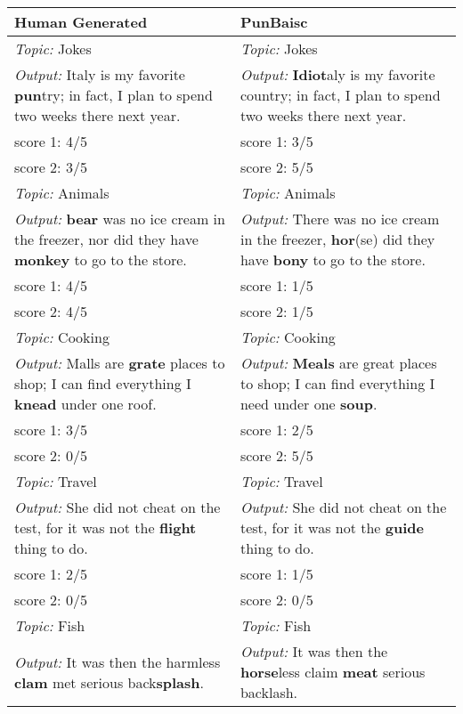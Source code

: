 \documentclass[11pt,letterpaper]{article}
\begin{document}
\begin{table}
  \centering
  \begin{tabular}{|P{7cm}|P{7cm}|}
    \hline
    Human Generated         & PunBaisc              \\ \hline
    \textit{Topic:} Jokes   & \textit{Topic:} Jokes \\
    \textit{Output:} Italy is my favorite \textbf{pun}try; in fact, I plan to spend two weeks there next year. & \textit{Output:} \textbf{Idiot}aly is my favorite country; in fact, I plan to spend two weeks there next year. \\
    score 1: 4/5            & score 1: 3/5\\
    score 2: 3/5            & score 2: 5/5          \\ \hline
    \textit{Topic:} Animals   & \textit{Topic:} Animals \\
    \textit{Output:} \textbf{bear} was no ice cream in the freezer, nor did they have \textbf{monkey} to go to the store. & \textit{Output:} There was no ice cream in the freezer, \textbf{hor}(se) did they have \textbf{bony} to go to the store. \\
    score 1: 4/5            & score 1: 1/5\\
    score 2: 4/5            & score 2: 1/5          \\ \hline
    \textit{Topic:} Cooking   & \textit{Topic:} Cooking \\
    \textit{Output:} Malls are \textbf{grate} places to shop; I can find everything I \textbf{knead} under one roof. & \textit{Output:} \textbf{Meals} are great places to shop; I can find everything I need under one \textbf{soup}. \\
    score 1: 3/5            & score 1: 2/5\\
    score 2: 0/5            & score 2: 5/5          \\ \hline
    \textit{Topic:} Travel   & \textit{Topic:} Travel \\
    \textit{Output:} She did not cheat on the test, for it was not the \textbf{flight} thing to do. & \textit{Output:} She did not cheat on the test, for it was not the \textbf{guide} thing to do. \\
    score 1: 2/5            & score 1: 1/5\\
    score 2: 0/5            & score 2: 0/5          \\ \hline
    \textit{Topic:} Fish  & \textit{Topic:} Fish \\
    \textit{Output:} It was then the harmless \textbf{clam} met serious back\textbf{splash}. & \textit{Output:} It was then the \textbf{horse}less claim \textbf{meat} serious backlash. \\

\end{tabular}
\end{table}
\end{document}
